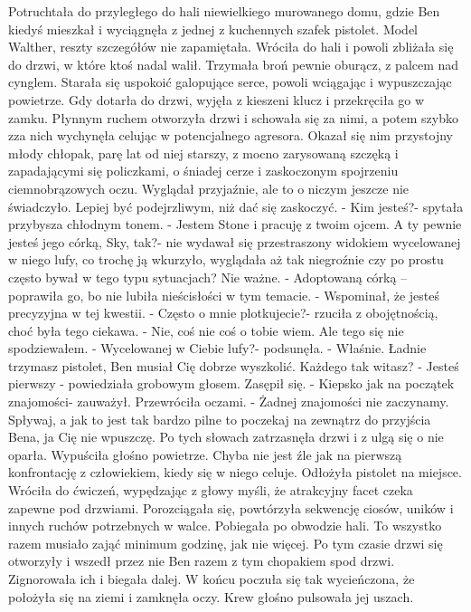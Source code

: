 \documentclass[12pt,a4paper]{book}
\begin{document}
Potruchtała do przyległego do hali niewielkiego murowanego domu, gdzie Ben kiedyś mieszkał i wyciągnęła z jednej z kuchennych szafek pistolet. Model Walther, reszty szczegółów nie zapamiętała. Wróciła do hali i powoli zbliżała się do drzwi, w które ktoś nadal walił. Trzymała broń pewnie oburącz, z palcem nad cynglem. Starała się uspokoić galopujące serce, powoli wciągając i wypuszczając powietrze. Gdy dotarła do drzwi, wyjęła z kieszeni klucz i przekręciła go w zamku. Płynnym ruchem otworzyła drzwi i schowała się za nimi, a potem szybko zza nich wychynęła celując w potencjalnego agresora. Okazał się nim przystojny młody chłopak, parę lat od niej starszy, z mocno zarysowaną szczęką i zapadającymi się policzkami, o śniadej cerze i zaskoczonym spojrzeniu ciemnobrązowych oczu. Wyglądał przyjaźnie, ale to o niczym jeszcze nie świadczyło. Lepiej być podejrzliwym, niż dać się zaskoczyć. 
- Kim jesteś?- spytała przybysza chłodnym tonem.
- Jestem Stone i pracuję z twoim ojcem. A ty pewnie jesteś jego córką, Sky, tak?- nie wydawał się przestraszony widokiem wycelowanej w niego lufy, co trochę ją wkurzyło, wyglądała aż tak niegroźnie czy po prostu często bywał w tego typu sytuacjach? Nie ważne. 
- Adoptowaną córką – poprawiła go, bo nie lubiła nieścisłości w tym temacie.
- Wspominał, że jesteś precyzyjna w tej kwestii. 
- Często o mnie plotkujecie?- rzuciła z obojętnością, choć była tego ciekawa. 
- Nie, coś nie coś o tobie wiem. Ale tego się nie spodziewałem.
- Wycelowanej w Ciebie lufy?- podsunęła.
- Właśnie. Ładnie trzymasz pistolet, Ben musiał Cię dobrze wyszkolić. Każdego tak witasz?
- Jesteś pierwszy - powiedziała grobowym głosem.
Zasępił się. 
- Kiepsko jak na początek znajomości- zauważył. 
Przewróciła oczami. 
- Żadnej znajomości nie zaczynamy. Spływaj, a jak to jest tak bardzo pilne to poczekaj na zewnątrz do przyjścia Bena, ja Cię nie wpuszczę.
Po tych słowach zatrzasnęła drzwi i z ulgą się o nie oparła. Wypuściła głośno powietrze. Chyba nie jest źle jak na pierwszą konfrontację z człowiekiem, kiedy się w niego celuje. Odłożyła pistolet na miejsce. Wróciła do ćwiczeń, wypędzając z głowy myśli, że atrakcyjny facet czeka zapewne pod drzwiami. Porozciągała się, powtórzyła sekwencję ciosów, uników i innych ruchów potrzebnych w walce. Pobiegała po obwodzie hali. To wszystko razem musiało zająć minimum godzinę, jak nie więcej. Po tym czasie drzwi się otworzyły i wszedł przez nie Ben razem z tym chopakiem spod drzwi. Zignorowała ich i biegała dalej. W końcu poczuła się tak wycieńczona, że położyła się na ziemi i zamknęła oczy. Krew głośno pulsowała jej uszach. 
\end{document}
